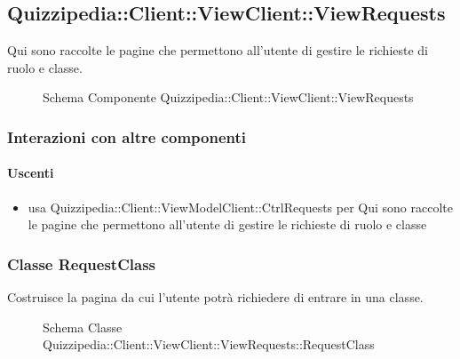 \subsection{Quizzipedia::Client::ViewClient::ViewRequests}
Qui sono raccolte le pagine che permettono all'utente di gestire le richieste di ruolo e classe.
\begin{figure}[H]
\centering
\noindent{}
\caption[Schema Componente Quizzipedia::Client::ViewClient::ViewRequests]{Schema Componente Quizzipedia::Client::ViewClient::ViewRequests}
\end{figure}
\subsubsection{Interazioni con altre componenti}
\paragraph{Uscenti}
\begin{itemize}
\item usa Quizzipedia::Client::ViewModelClient::CtrlRequests per Qui sono raccolte le pagine che permettono all'utente di gestire le richieste di ruolo e classe
\end{itemize}
\subsubsection{Classe RequestClass}
Costruisce la pagina da cui l'utente potrà richiedere di entrare in una classe.
\begin{figure}[H]
\centering
\noindent{}
\caption[Schema Classe RequestClass]{Schema Classe Quizzipedia::Client::ViewClient::ViewRequests::RequestClass}
\end{figure}

